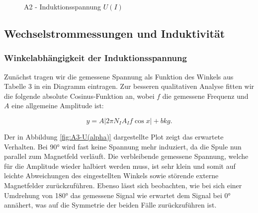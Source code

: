\documentclass{article}
\begin{document}
\begin{figure}[!h]
    \centering
    \caption{A2 - Induktionsspannung $U(I)$}
    \label{fig:A2-U(I)}
\end{figure}

\clearpage
\newpage

\subsection{Wechselstrommessungen und Induktivität}

\subsubsection{Winkelabhängigkeit der Induktionsspannung}

Zunächst tragen wir die gemessene Spannung als Funktion des Winkels aus Tabelle 3 in ein Diagramm eintragen. Zur besseren qualitativen Analyse fitten wir die folgende absolute Cosinus-Funktion an, wobei $f$ die gemessene Frequenz und $A$ eine allgemeine Amplitude ist: 

\begin{equation}
    y = A |2 \pi N_I A_I f \cos{x}| + bkg.
\end{equation}

Der in Abbildung \ref{fig:A3-U(alpha)} dargestellte Plot zeigt das erwartete Verhalten. Bei 90° wird fast keine Spannung mehr induziert, da die Spule nun parallel zum Magnetfeld verläuft. Die verbleibende gemessene Spannung, welche für die Amplitude wieder halbiert werden muss, ist sehr klein und somit auf leichte Abweichungen des eingestellten Winkels sowie störende externe Magnetfelder zurückzuführen. Ebenso lässt sich beobachten, wie bei sich einer Umdrehung von 180° das gemessene Signal wie erwartet dem Signal bei 0° annähert, was auf die Symmetrie der beiden Fälle zurückzuführen ist. 
\end{document}
